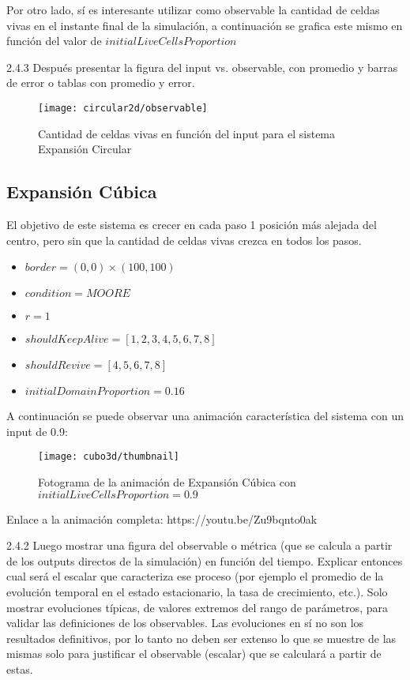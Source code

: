 Por otro lado, sí es interesante utilizar como observable la cantidad de celdas vivas en el instante final de la simulación, a continuación se
grafica este mismo en función del valor de $initialLiveCellsProportion$

2.4.3 Después presentar la figura del input vs. observable, con promedio y barras de error o tablas 
con promedio y error. 


\begin{figure}[H]
    \centering
    \texttt{[image: circular2d/observable]}
    \caption{Cantidad de celdas vivas en función del input para el sistema Expansión Circular}
    \label{fig:circular2d_observable}
\end{figure}






\subsection{Expansión Cúbica}\label{subsec:cubito-3D}

El objetivo de este sistema es crecer en cada paso 1 posición más alejada del centro, pero sin que la cantidad de celdas vivas crezca en todos los pasos.

\begin{itemize}
    \item $border = (0, 0) \times (100, 100)$
    \item $condition = MOORE$
    \item $r = 1$
    \item $shouldKeepAlive = [1, 2, 3, 4, 5, 6, 7, 8]$
    \item $shouldRevive = [4, 5, 6, 7, 8]$
    \item $initialDomainProportion = 0.16$
\end{itemize}


A continuación se puede observar una animación característica del sistema con un input de 0.9:

\begin{figure}[H]
    \centering
    \texttt{[image: cubo3d/thumbnail]}
    \caption{Fotograma de la animación de Expansión Cúbica con $initialLiveCellsProportion = 0.9$}
    \label{fig:thumbnailcubo3d_i90}
\end{figure}

Enlace a la animación completa: https://youtu.be/Zu9bqnto0ak


2.4.2 Luego mostrar una figura del observable o métrica (que se calcula a partir de los outputs 
directos de la simulación) en función del tiempo. Explicar entonces cual será el escalar que 
caracteriza ese proceso (por ejemplo el promedio de la evolución temporal en el estado 
estacionario, la tasa de crecimiento, etc.). Solo mostrar evoluciones típicas, de valores extremos 
del rango de parámetros, para validar las definiciones de los observables. Las evoluciones en sí 
no son los resultados definitivos, por lo tanto no deben ser extenso lo que se muestre de las 
mismas solo para justificar el observable (escalar) que se calculará a partir de estas.


